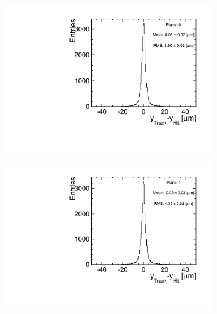 \begin{figure}[htbp] \centering
  \begin{subfigure}[b]{0.3\textwidth}
    \includegraphics[width=\textwidth]{figures/Telescope/biasedResiduals/BiasedResiduals_run49_PlaneYRMS0.pdf}
    \caption{}
  \end{subfigure}\hfill
  \begin{subfigure}[b]{0.3\textwidth}
    \includegraphics[width=\textwidth]{figures/Telescope/biasedResiduals/BiasedResiduals_run49_PlaneYRMS1.pdf}
    \caption{}
  \end{subfigure}\hfill
  \begin{subfigure}[b]{0.3\textwidth}

\end{subfigure}
\end{figure}
